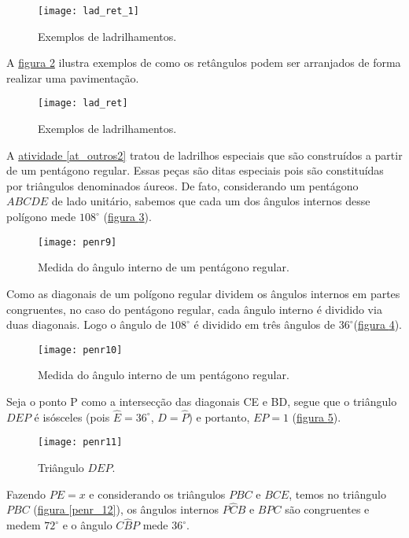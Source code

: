 {\begin{figure}[H]
	\centering
	\texttt{[image: lad\_ret\_1]}
	\caption{Exemplos de ladrilhamentos.}
	\label{lad_ret1}
	\end{figure}


A \hyperref[lad_ret]{figura \ref{lad_ret}} ilustra exemplos de como os retângulos podem ser arranjados de forma realizar uma pavimentação.
 \begin{figure}[H]
	\centering
	\texttt{[image: lad\_ret]}
	\caption{Exemplos de ladrilhamentos.}
	\label{lad_ret}
	\end{figure}

A \hyperref[at_outros2]{atividade \ref{at_outros2}} tratou de ladrilhos especiais que são construídos a partir de um pentágono regular. Essas peças são ditas especiais pois são constituídas por triângulos denominados áureos. De fato, considerando  um pentágono $ABCDE$ de lado unitário, sabemos que cada um dos ângulos internos desse polígono mede $108^{\circ}$ (\hyperref[penr_9]{figura \ref{penr_9}}). 

\begin{figure}[H]
	\centering
	\texttt{[image: penr9]}
	\caption{Medida do ângulo interno de um pentágono regular.}
	\label{penr_9}
	\end{figure}


Como as diagonais de um polígono regular dividem os ângulos internos em partes congruentes, no caso do pentágono regular, cada ângulo interno é dividido via duas diagonais. Logo o ângulo de  $108^{\circ}$ é dividido em três ângulos de $36^{\circ}$(\hyperref[penr_10]{figura \ref{penr_10}}). 


\begin{figure}[H]
\centering
\texttt{[image: penr10]}
\caption{Medida do ângulo interno de um pentágono regular.}
\label{penr_10}
\end{figure}


Seja o ponto P como a intersecção das diagonais CE e BD, segue que  o triângulo $DEP$ é isósceles (pois $\hat{E}= 36^{\circ}$, $\hat{D}=\hat{P}$) e portanto, $EP=1$ (\hyperref[penr_11]{figura \ref{penr_11}}).

\begin{figure}[H]
	\centering
	\texttt{[image: penr11]}
	\caption{Triângulo $DEP$.}
	\label{penr_11}
\end{figure}


Fazendo $PE =x$ e considerando os triângulos $PBC$ e $BCE$, temos no triângulo $PBC$ (\hyperref[penr_12]{figura \ref{penr_12}}), os ângulos internos $P\hat{C}B$ e $B\hat{P}C$ são congruentes e medem $72^{\circ}$ e o ângulo $C\hat{B}P$ mede $36^{\circ}$. 

}
